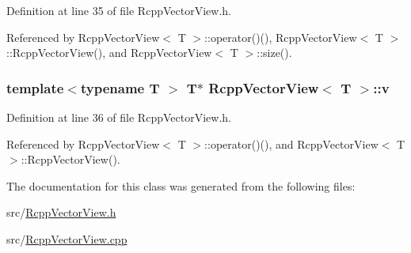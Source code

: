Definition at line 35 of file RcppVectorView.h.

Referenced by RcppVectorView$<$ T $>$::operator()(), RcppVectorView$<$ T $>$::RcppVectorView(), and RcppVectorView$<$ T $>$::size().\hypertarget{classRcppVectorView_ae3dc3546d0dd0e3de95800b7c91857e8}{
\subsubsection[{v}]{\setlength{\rightskip}{0pt plus 5cm}template$<$typename T $>$ T$\ast$ {\bf RcppVectorView}$<$ T $>$::{\bf v}}}
\label{classRcppVectorView_ae3dc3546d0dd0e3de95800b7c91857e8}


Definition at line 36 of file RcppVectorView.h.

Referenced by RcppVectorView$<$ T $>$::operator()(), and RcppVectorView$<$ T $>$::RcppVectorView().

The documentation for this class was generated from the following files:\begin{DoxyCompactItemize}
\item 
src/\hyperlink{RcppVectorView_8h}{RcppVectorView.h}\item 
src/\hyperlink{RcppVectorView_8cpp}{RcppVectorView.cpp}\end{DoxyCompactItemize}
